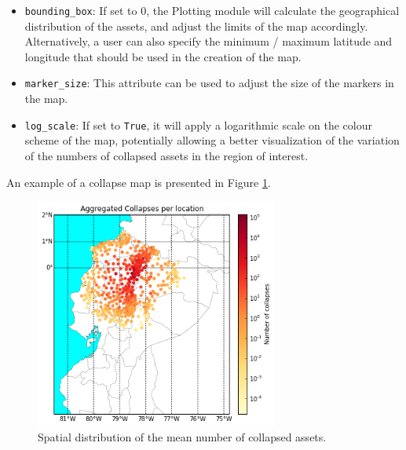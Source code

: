 \begin{itemize}
\item \verb=bounding_box=: If set to 0, the Plotting module will calculate the geographical distribution of the assets, and adjust the limits of the map accordingly. Alternatively, a user can also specify the minimum / maximum latitude and longitude that should be used in the creation of the map.
\item \verb=marker_size=: This attribute can be used to adjust the size of the markers in the map.
\item \verb=log_scale=: If set to \verb=True=, it will apply a logarithmic scale on the colour scheme of the map, potentially allowing a better visualization of the variation of the numbers of collapsed assets in the region of interest.\\
\end{itemize}

An example of a collapse map is presented in Figure \ref{fig:collapse_map}.

\begin{figure}[htb]
  \centering
      \includegraphics[width=8cm]{figures/collapse_map.png}
  \caption{Spatial distribution of the mean number of collapsed assets.}
  \label{fig:collapse_map}
\end{figure}
